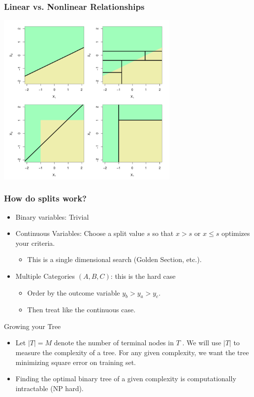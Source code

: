 \documentclass[xcolor=pdftex,dvipsnames,table,mathserif,aspectratio=169]{beamer}
\begin{document}
\begin{frame}
\frametitle{Linear vs. Nonlinear Relationships}
\includegraphics[width=3.5in]{./resources/treefit.png}
\end{frame}


\begin{frame}
\frametitle{How do splits work?}
\begin{itemize}
\item Binary variables: Trivial
\item Continuous Variables: Choose a split value $s$ so that $x>s$ or $x\leq s$ optimizes your criteria.
\begin{itemize}
\item This is a single dimensional search (Golden Section, etc.).
\end{itemize}
\item Multiple Categories $(A,B,C)$: this is the hard case
\begin{itemize}
\item Order by the outcome variable $y_b > y_a > y_c$.
\item Then treat like the continuous case.
\end{itemize}
\end{itemize}
\end{frame}

\begin{frame}{Growing your Tree}
\begin{itemize}
\item Let $|T| = M$ denote the number of terminal nodes in $T$ . We will use $|T|$ to measure the complexity of a tree. For any given complexity,
we want the tree minimizing square error on training set.
\item Finding the optimal binary tree of a given complexity is computationally intractable (NP hard).
\end{itemize}
\end{frame}
\end{document}
